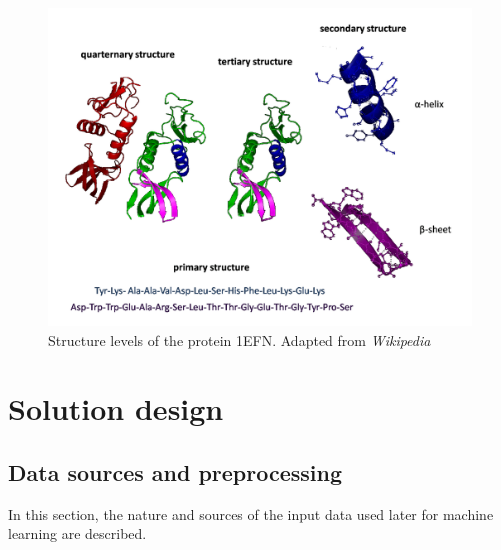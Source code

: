\documentclass[11pt,twoside,a4paper]{book}
\begin{document}
\begin{landscape}
\begin{figure}[h]
\begin{center}
\includegraphics[width=21cm]{figures/Protein_structure}
\caption[Structure levels of the protein 1EFN]{Structure levels of the protein 1EFN. Adapted from \emph{Wikipedia}}
\label{fig:Protein_structure}
\end{center}
\end{figure}
\end{landscape}



\chapter{Solution design}

\section{Data sources and preprocessing}
\label{sec:data}
In this section, the nature and sources of the input data used later for machine learning are described.
\end{document}

